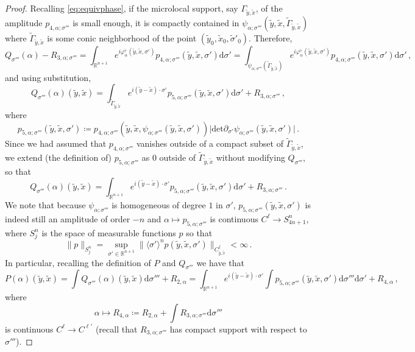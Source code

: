 \documentclass[11pt]{amsart}
\theoremstyle{definition}
\numberwithin{equation}{section}
\newcommand{\mR}{\mathbb{R}}                    %
\newcommand{\abs}[1]{\lvert #1 \rvert}          %
\newcommand{\norm}[1]{\lVert #1 \rVert}         %
\newcommand{\dd}{\mathrm{d}}
\begin{document}
\begin{proof}
	Recalling \eqref{eq:equivphase}, if the microlocal support, say $\Gamma_{\tilde{y},\tilde{x}}$, of the amplitude $p_{4,\alpha;\sigma'''}$ is small enough, it is compactly contained in $\psi_{\alpha;\sigma'''}(\tilde{y},\tilde{x},\tilde{\Gamma}_{\tilde{y},\tilde{x}})$ where $\tilde{\Gamma}_{\tilde{y},\tilde{x}}$ is some conic neighborhood of the point $(\tilde{y}_0,\tilde{x}_0,\tilde{\sigma}'_0)$. Therefore, 
    \[
        Q_{\sigma'''}(\alpha)-R_{3,\alpha;\sigma'''} = \int_{\mR^{n+1}} e^{i\varphi_\alpha^\flat(\tilde{y},\tilde{x},\sigma')}  p_{4,\alpha;\sigma'''}(\tilde{y},\tilde{x},\sigma') \dd\sigma' = \int_{\psi_{\alpha;\sigma'''}(\tilde{\Gamma}_{\tilde{y},\tilde{x}})} e^{i\varphi_\alpha^\flat(\tilde{y},\tilde{x},\sigma')}  p_{4,\alpha;\sigma'''}(\tilde{y},\tilde{x},\sigma') \dd\sigma'\,,
    \]
    and using substitution,
	\[
		Q_{\sigma'''}(\alpha)(\tilde{y},\tilde{x}) = \int_{\tilde{\Gamma}_{\tilde{y},\tilde{x}}} e^{i(\tilde{y}-\tilde{x})\cdot \sigma'} p_{5,\alpha;\sigma'''}(\tilde{y},\tilde{x},
    \sigma')\dd\sigma'+R_{3,\alpha;\sigma'''}\,,%
	\]
    where
    \[
        p_{5,\alpha;\sigma'''}(\tilde{y},\tilde{x},\sigma') \coloneqq p_{4,\alpha;\sigma'''}(\tilde{y},\tilde{x},\psi_{\alpha;\sigma'''}(\tilde{y},\tilde{x},\sigma'))%
        \abs{\mathrm{det}\partial_{\sigma'}\psi_{\alpha;\sigma'''}(\tilde{y},\tilde{x},\sigma')}\,.
    \]
    Since we had assumed that $p_{4,\alpha;\sigma'''}$ vanishes outside of a compact subset of $\tilde{\Gamma}_{\tilde{y},\tilde{x}}$, we extend (the definition of) $p_{5,\alpha;\sigma'''}$ as $0$ outside of $\tilde{\Gamma}_{\tilde{y},\tilde{x}}$ without modifying $Q_{\sigma'''}$, so that
    \[
        Q_{\sigma'''}(\alpha)(\tilde{y},\tilde{x}) = \int_{\mR^{n+1}} e^{i(\tilde{y}-\tilde{x})\cdot \sigma'} p_{5,\alpha;\sigma'''}(\tilde{y},\tilde{x},
    \sigma')\dd\sigma'+R_{3,\alpha;\sigma'''}\,.
    \]
    We note that because $\psi_{\alpha;\sigma'''}$ is homogeneous of degree $1$ in $\sigma'$, $p_{5,\alpha;\sigma'''}(\tilde{y},\tilde{x},\sigma')$ is indeed still an amplitude of order $-n$ and $\alpha \mapsto p_{5,\alpha;\sigma'''}$ is continuous $C^{\ell} \to S^n_{4n+1}$, where $S^n_{j}$ is the space of measurable functions $p$ so that
	\begin{equation}\label{eq:defineSj}
		\norm{p}_{S^n_{j}} = \sup_{\sigma'\in \mR^{n+1}}\norm{\langle \sigma'\rangle^n p(\tilde{y},\tilde{x},\sigma')}_{C^{j}_{\tilde{y},\tilde{x}}} < \infty\,.
	\end{equation}
	In particular, recalling the definition of $P$ and $Q_{\sigma'''}$ we have that
	\[
		P(\alpha)(\tilde{y},\tilde{x}) = \int Q_{\sigma'''}(\alpha)(\tilde{y},\tilde{x}) \dd\sigma'''+R_{2,\alpha} = \int_{\mR^{n+1}} e^{i(\tilde{y}-\tilde{x})\cdot \sigma'} \int %
        p_{5,\alpha;\sigma'''}(\tilde{y},\tilde{x},\sigma')\dd\sigma''' \dd \sigma'+R_{4,\alpha}\,,%
	\]
    where
    \[
        \alpha \mapsto R_{4,\alpha} \coloneqq R_{2,\alpha}+\int R_{3,\alpha;\sigma'''} \dd \sigma'''
    \]
    is continuous $C^{\ell}\to C^{\ell'}$ (recall that $R_{3,\alpha;\sigma'''}$ has compact support with respect to $\sigma'''$). 


\end{proof}
\end{document}
